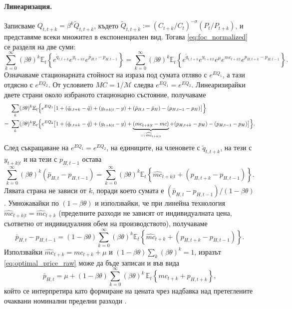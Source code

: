 \paragraph{Линеаризация.}
Записваме $Q_{t,t+k} = \beta^k \tilde{Q}_{t,t+k}$, където $\tilde{Q}_{t,t+k} := (C_{t+k}/C_t)^{-\sigma}(P_t/P_{t+k})$, и представяме всеки множител в експоненциален вид. Тогава \eqref{eq:foc_normalized} се разделя на две суми:
\begin{equation}
\sum_{k=0}^{\infty} (\beta\theta)^k \mathbb{E}_t \left\{ e^{\tilde{q}_{t,t+k}} e^{y_{t+k|t}} e^{\bar{p}_{H,t} - p_{H,t-1}} \right\}
= \sum_{k=0}^{\infty} (\beta\theta)^k \mathbb{E}_t \left\{ e^{\tilde{q}_{t,t+k}} e^{y_{t+k|t}} e^{\mu} e^{mc_{t+k|t}} e^{p_{H,t+k} - p_{H,t-1}} \right\}.
\label{eq:foc_exp}
\end{equation}
Означаваме стационарната стойност на израза под сумата отляво с $e^{EQ_1}$, а тази отдясно с $e^{EQ_2}$. От условието $MC = 1/\mathcal{M}$ следва $e^{EQ_1} = e^{EQ_2}$. Линеаризирайки двете страни около избраното стационарно състояние, получаваме
\begin{align}
&\sum_{k} (\beta\theta)^k \mathbb{E}_t \Big\{ e^{EQ_1} \big[ 1 + (\tilde{q}_{t,t+k} - \tilde{q}) + (y_{t+k|t} - y)
+ (\bar{p}_{H,t} - \bar{p}_H) - (p_{H,t-1} - p_H) \big] \Big\} \notag \\
= \ &\sum_{k} (\beta\theta)^k \mathbb{E}_t \Big\{ e^{EQ_2} \big[ 1 + (\tilde{q}_{t,t+k} - \tilde{q}) + (y_{t+k|t} - y)
+ \underbrace{(mc_{t+k|t} - mc)}_{=: \, \widehat{mc}_{t+k|t}} + (p_{H,t+k} - p_H) - (p_{H,t-1} - p_H) \big] \Big\}.
\label{eq:foc_linearized}
\end{align}
След съкращаване на $e^{EQ_1} = e^{EQ_2}$, на единиците, на членовете с $\tilde{q}_{t,t+k}$, на тези с $y_{t+k|t}$ и на тези с $p_{H,t-1}$ остава
\[
\sum_{k=0}^{\infty} (\beta\theta)^k \left( \bar{p}_{H,t} - p_{H,t-1} \right)
= \sum_{k=0}^{\infty} (\beta\theta)^k \mathbb{E}_t \left\{ \widehat{mc}_{t+k|t} + (p_{H,t+k} - p_{H,t-1}) \right\}.
\]
Лявата страна не зависи от $k$, поради което сумата е $(\bar{p}_{H,t} - p_{H,t-1})/(1-\beta\theta)$. Умножавайки по $(1-\beta\theta)$ и използвайки, че при линейна технология $\widehat{mc}_{t+k|t} = \widehat{mc}_{t+k}$ (пределните разходи не зависят от индивидуалната цена, съответно от индивидуалния обем на производството), получаваме
\begin{equation}
\bar{p}_{H,t} - p_{H,t-1} = (1-\beta\theta) \sum_{k=0}^{\infty} (\beta\theta)^k
\mathbb{E}_t \left\{ \widehat{mc}_{t+k} + (p_{H,t+k} - p_{H,t-1}) \right\}.
\label{eq:optimal_price_raw}
\end{equation}
Използвайки $\widehat{mc}_{t+k} = mc_{t+k} + \mu$ и $(1-\beta\theta)\sum_k(\beta\theta)^k = 1$, изразът \eqref{eq:optimal_price_raw} може да бъде записан и във вида
\begin{equation}
\bar{p}_{H,t} = \mu + (1-\beta\theta) \sum_{k=0}^{\infty} (\beta\theta)^k\, \mathbb{E}_t \left\{ mc_{t+k} + p_{H,t+k} \right\},
\label{eq:optimal_price_log}
\end{equation}
който се интерпретира като формиране на цената чрез надбавка над претеглените очаквани номинални пределни разходи \parencite[с.~159]{Gali2008}.

